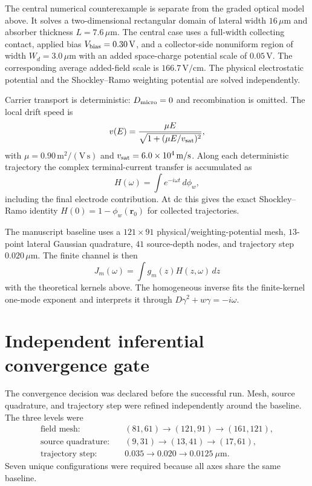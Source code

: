 \documentclass[aps,pra,onecolumn,superscriptaddress,nofootinbib]{revtex4-2}
\begin{document}
The central numerical counterexample is separate from the graded optical model above.  It solves a two-dimensional rectangular domain of lateral width $16\,\mu\mathrm{m}$ and absorber thickness $L=7.6\,\mu\mathrm{m}$.  The central case uses a full-width collecting contact, applied bias $V_{\rm bias}=0.30\,\mathrm{V}$, and a collector-side nonuniform region of width $W_d=3.0\,\mu\mathrm{m}$ with an added space-charge potential scale of $0.05\,\mathrm{V}$.  The corresponding average added-field scale is $166.7\,\mathrm{V/cm}$.  The physical electrostatic potential and the Shockley--Ramo weighting potential are solved independently.

Carrier transport is deterministic: $D_{\rm micro}=0$ and recombination is omitted.  The local drift speed is
\begin{equation}
v(E)=\frac{\mu E}{\sqrt{1+(\mu E/v_{\rm sat})^2}},
\end{equation}
with $\mu=0.90\,\mathrm{m^2/(V\,s)}$ and $v_{\rm sat}=6.0\times10^4\,\mathrm{m/s}$.  Along each deterministic trajectory the complex terminal-current transfer is accumulated as
\begin{equation}
H(\omega)=\int e^{-i\omega t}\,d\phi_w,
\end{equation}
including the final electrode contribution.  At dc this gives the exact Shockley--Ramo identity $H(0)=1-\phi_w(\mathbf r_0)$ for collected trajectories.

The manuscript baseline uses a $121\times91$ physical/weighting-potential mesh, $13$-point lateral Gaussian quadrature, $41$ source-depth nodes, and trajectory step $0.020\,\mu\mathrm{m}$.  The finite channel is then
\begin{equation}
J_m(\omega)=\int g_m(z)H(z,\omega)\,dz
\end{equation}
with the theoretical kernels above.  The homogeneous inverse fits the finite-kernel one-mode exponent and interprets it through $D\gamma^2+w\gamma=-i\omega$.

\section{Independent inferential convergence gate}

The convergence decision was declared before the successful run.  Mesh, source quadrature, and trajectory step were refined independently around the baseline.  The three levels were
\begin{align*}
\text{field mesh:}\quad &(81,61)\rightarrow(121,91)\rightarrow(161,121),\\
\text{source quadrature:}\quad &(9,31)\rightarrow(13,41)\rightarrow(17,61),\\
\text{trajectory step:}\quad &0.035\rightarrow0.020\rightarrow0.0125\ \mu\mathrm{m}.
\end{align*}
Seven unique configurations were required because all axes share the same baseline.
\end{document}
